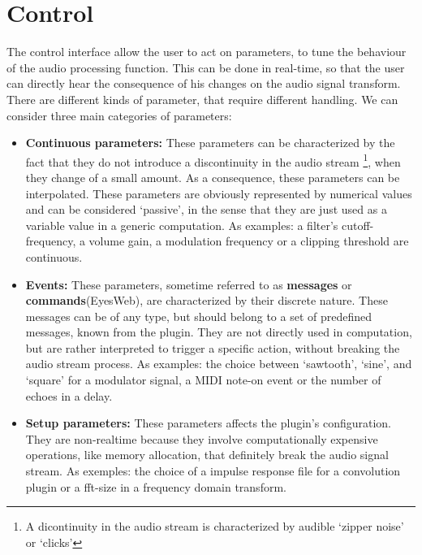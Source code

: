 
\chapter{Control}

\noindent The control interface allow the user to act on parameters, to tune the behaviour of the audio processing function. This can be done in real-time, so that the user can directly hear the consequence of his changes on the audio signal transform.\\
\noindent There are different kinds of parameter, that require different handling. We can consider three main categories of parameters:
\begin{itemize}
\item{\textbf{Continuous parameters:}} These parameters can be characterized by the fact that they do not introduce a discontinuity in the audio stream \footnote{A dicontinuity in the audio stream is characterized by audible `zipper noise' or `clicks'}, when they change of a small amount. As a consequence, these parameters can be interpolated. These parameters are obviously represented by numerical values and can be considered `passive', in the sense that they are just used as a variable value in a generic computation. As examples: a filter's cutoff-frequency, a volume gain, a modulation frequency or a clipping threshold are continuous.

\item{\textbf{Events:}} These parameters, sometime referred to as \textbf{messages} or \textbf{commands}(EyesWeb), are characterized by their discrete nature. These messages can be of any type, but should belong to a set of predefined messages, known from the plugin. They are not directly used in computation, but are rather interpreted to trigger a specific action, without breaking the audio stream process. As examples: the choice between `sawtooth', `sine', and `square' for a modulator signal, a MIDI note-on event or the number of echoes in a delay.

\item{\textbf{Setup parameters:}} These parameters affects the plugin's configuration. They are non-realtime because they involve computationally expensive operations, like memory allocation, that definitely break the audio signal stream. As exemples: the choice of a impulse response file for a convolution plugin or a fft-size in a frequency domain transform.
\end{itemize}

